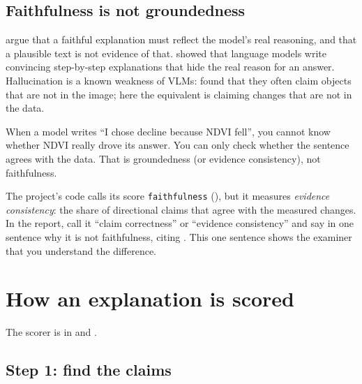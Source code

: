 \subsection{Faithfulness is not groundedness}

\citet{jacovi2020} argue that a faithful explanation must reflect the model's real reasoning, and that a plausible text is not evidence of that. \citet{turpin2023} showed that language models write convincing step-by-step explanations that hide the real reason for an answer. Hallucination is a known weakness of VLMs: \citet{li2023pope} found that they often claim objects that are not in the image; here the equivalent is claiming changes that are not in the data.

\begin{plainwords}
When a model writes ``I chose decline because NDVI fell'', you cannot know whether NDVI really drove its answer. You can only check whether the sentence agrees with the data. That is groundedness (or evidence consistency), not faithfulness.
\end{plainwords}

\begin{foryourreport}
The project's code calls its score \texttt{faithfulness} (), but it measures \emph{evidence consistency}: the share of directional claims that agree with the measured changes. In the report, call it ``claim correctness'' or ``evidence consistency'' and say in one sentence why it is not faithfulness, citing \citet{jacovi2020}. This one sentence shows the examiner that you understand the difference.
\end{foryourreport}

\section{How an explanation is scored}
\label{sec:scorer}

The scorer is in  and .

\subsection{Step 1: find the claims}

